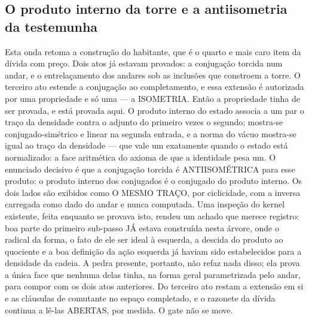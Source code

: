 \documentclass[11pt]{article}
\theoremstyle{definition}\newtheorem{deriv}{Derivação}
\begin{document}
\subsection*{O produto interno da torre e a antiisometria da testemunha}Esta onda retoma a constru\c{c}\~ao do habitante, que \'e o quarto e mais caro item da d\'ivida com pre\c{c}o. Dois atos j\'a estavam provados: a conjuga\c{c}\~ao torcida num andar, e o entrela\c{c}amento dos andares sob as inclus\~oes que constroem a torre. O terceiro ato estende a conjuga\c{c}\~ao ao completamento, e essa extens\~ao \'e autorizada por uma propriedade e s\'o uma --- a ISOMETRIA. Ent\~ao a propriedade tinha de ser provada, e est\'a provada aqui. O produto interno do estado associa a um par o tra\c{c}o da densidade contra o adjunto do primeiro vezes o segundo; mostra-se conjugado-sim\'etrico e linear na segunda entrada, e a norma do v\'acuo mostra-se igual ao tra\c{c}o da densidade --- que vale um exatamente quando o estado est\'a normalizado: a face aritm\'etica do axioma de que a identidade pesa um. O enunciado decisivo \'e que a conjuga\c{c}\~ao torcida \'e ANTIISOM\'ETRICA para esse produto: o produto interno dos conjugados \'e o conjugado do produto interno. Os dois lados s\~ao exibidos como O MESMO TRA\c{C}O, por ciclicidade, com a inversa carregada como dado do andar e nunca computada. Uma inspe\c{c}\~ao do kernel existente, feita enquanto se provava isto, rendeu um achado que merece registro: boa parte do primeiro sub-passo J\'A estava constru\'ida nesta \'arvore, onde o radical da forma, o fato de ele ser ideal \`a esquerda, a descida do produto ao quociente e a boa defini\c{c}\~ao da a\c{c}\~ao esquerda j\'a haviam sido estabelecidos para a densidade da cadeia. A pedra presente, portanto, n\~ao refaz nada disso; ela prova a \'unica face que nenhuma delas tinha, na forma geral parametrizada pelo andar, para compor com os dois atos anteriores. Do terceiro ato restam a extens\~ao em si e as cl\'ausulas de comutante no espa\c{c}o completado, e o razonete da d\'ivida continua a l\^e-las ABERTAS, por medida. O gate n\~ao se move.
\end{document}
